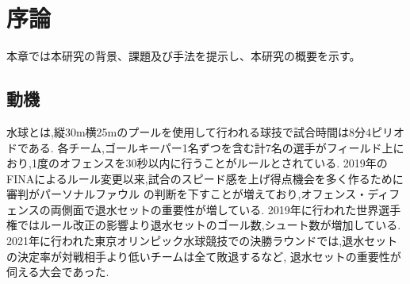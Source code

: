 \documentclass[../main.tex]{subfiles}
\begin{document}
\chapter{序論}

本章では本研究の背景、課題及び手法を提示し、本研究の概要を示す。


\section{動機}
水球とは,縦30m横25mのプールを使用して行われる球技で試合時間は8分\times4ピリオドである.
各チーム,ゴールキーパー1名ずつを含む計7名の選手がフィールド上におり,1度のオフェンスを30秒以内に行うことがルールとされている.
2019年のFINAによるルール変更以来,試合のスピード感を上げ得点機会を多く作るために審判がパーソナルファウル
の判断を下すことが増えており,オフェンス・ディフェンスの両側面で退水セットの重要性が増している.
2019年に行われた世界選手権ではルール改正の影響より退水セットのゴール数,シュート数が増加している.\cite{weko_1677_1}
2021年に行われた東京オリンピック水球競技での決勝ラウンドでは,退水セットの決定率が対戦相手より低いチームは全て敗退するなど\cite{weko_1697_1},
退水セットの重要性が伺える大会であった.
\end{document}

